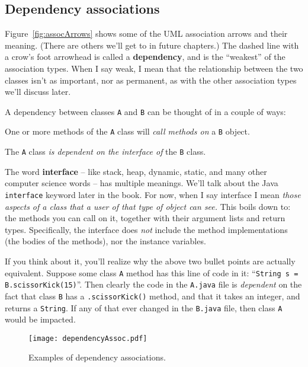 \subsection{Dependency associations}

Figure~\ref{fig:assocArrows} shows some of the UML association arrows and
their meaning. (There are others we'll get to in future chapters.) The dashed
line with a crow's foot arrowhead is called a \textbf{dependency}, and is the
``weakest'' of the association types. When I say weak, I mean that the
relationship between the two classes isn't as important, nor as permanent, as
with the other association types we'll discuss later.

A dependency between classes \texttt{A} and \texttt{B} can be thought of in a
couple of ways:

\begin{compactitem}
\item One or more methods of the \texttt{A} class will \textit{call methods
on} a \texttt{B} object.
\item The \texttt{A} class \textit{is dependent on the interface of} the
\texttt{B} class.
\end{compactitem}

The word \textbf{interface} -- like stack, heap, dynamic, static, and many
other computer science words -- has multiple meanings. We'll talk about the
Java \texttt{interface} keyword later in the book. For now, when I say
interface I mean \textit{those aspects of a class that a user of that type of
object can see.} This boils down to: the methods you can call on it, together
with their argument lists and return types. Specifically, the interface does
\textit{not} include the method implementations (the bodies of the methods),
nor the instance variables.

If you think about it, you'll realize why the above two bullet points are
actually equivalent. Suppose some class \texttt{A} method has this line of
code in it: ``\texttt{String s = B.scissorKick(15)}''. Then clearly the code in
the \texttt{A.java} file is \textit{dependent} on the fact that class
\texttt{B} has a \texttt{.scissorKick()} method, and that it takes an integer,
and returns a \texttt{String}. If any of that ever changed in the
\texttt{B.java} file, then class \texttt{A} would be impacted.

\begin{figure}[ht]
\centering
\texttt{[image: dependencyAssoc.pdf]}   %
\caption{Examples of dependency associations.}
\label{fig:dependencyExamples}
\end{figure}

